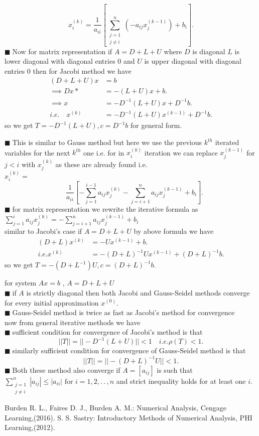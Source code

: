 \documentclass[11pt]{extarticle}
\newcommand{\ck}{.\,.\,}
\newcommand{\sm}[2]{\displaystyle\sum_{#1}^{#2}}
\newcommand{\tbx}[2][]{
\begin{tcolorbox}[enhanced,breakable,size=small,colback=black!2!white,title={#1},arc is angular, arc=1.5mm,drop fuzzy shadow]
	#2
\end{tcolorbox}
}
\newcommand{\y}{$\blacksquare\;$}
\begin{document}
\begin{multicols}{2}
{				\[ x_i^{(k)}=\frac{ 1 }{a_{ii}} \left[\sm{\substack{j=1 \\ j\neq i}}{n}(-a_{ij}x_j^{(k-1)}) +b_i\right].\]
				 \y Now for matrix representation if $ A=D+L+U $ where $ D $ is diagonal $ L $ is lower diagonal with diagonal entries $ 0 $ and $ U $ is upper diagonal with diagonal entries $ 0 $ then for Jacobi method we have 
				 \begin{align*}
				 	(D+L+U)x&=b\\
				 	\implies Dx*&= -(L+U)x+b.\\
				 	\implies x&=-D^{-1}(L+U)x+D^{-1}b.\\
				 	i.e. \quad x^{(k)}&=-D^{-1}(L+U)x^{(k-1)}+D^{-1}b.
				 	\end{align*}  
			 	so we get $ T=-D^{-1}(L+U),c=D^{-1}b $ for general form.}
				 \tbx[Gauss-Seidel Method]{ \y This is similar to Gauss method but here we use the previous $ k^{th} $ iterated variables for the next $ k^{th} $ one  i.e. for in $ x_i^{(k)} $ iteration we can replace $ x_j^{(k-1)} $ for $ j<i $ with $ x_j^{(k)} $ as these are already found i.e.\\
				 	 $x_i^{(k)}=$
				 \[\quad \frac{ 1 }{a_{ii}} \left[-\sm{j=1}{i-1}a_{ij}x_j^{(k)}-\sm{j=i+1}{n}a_{ij}x_j^{(k-1)}+b_i\right].\] 
				 \y for matrix representation we rewrite the iterative formula as \\
				 $\sm{j=1}{i}a_{ij}x_j^{(k)}=-\sm{j=i+1}{n}a_{ij}x_j^{(k-1)}+b_i$\\
				 similar to Jacobi's case if $ A=D+L+U $ by above formula we have 
				{ \small
					\begin{align*}
				 	(D+L)x^{(k)}&=-Ux^{(k-1)}+b.\\
				 	i.e. x^{(k)}&= -(D+L)^{-1}Ux^{(k-1)}+(D+L)^{-1}b.
				 	\end{align*}}
			 	so we get $ T=-(D+L^{-1})U,c=(D+L)^{-1}b. $ }
			 	\tbx{ for system $ Ax=b $ , $ A=D+L+U $ \\
			 		\y if $  A$ is strictly diagonal then both Jacobi and Gauss-Seidel methods converge for every initial approximation $ x^{(0)}. $ \\
			 		\y  Gauss-Seidel method is twice as fast as Jacobi's method for convergence \\
			 		now from general iterative methods we have \\
			 		\y sufficient condition for convergence of Jacobi's method is that 
			 		\[||T||=||-D^{-1}(L+U)||<1\quad i.e. \rho(T)<1.\]
			 		\y similarly  sufficient condition for convergence of Gauss-Seidel method is that 
			 		\[ ||T||=||-(D+L)^{-1}U||<1.\]
			 		\y Both these method also converge if $ A =[a_{ij}]$ is such that \\
			 		 $ \sm{\substack{j=1\\ j\neq i}}{n}|a_{ij}|\leq |a_{ii}| \text{ for } i=1,2,\ck,n $ and strict inequality holds for at least one $ i $.   }
			 		 
			 		 
\begin{thebibliography}{9}
	Burden R. L., Faires D. J., Burden A. M.: Numerical Analysis, Cengage Learning,(2016).
	S. S. Sastry: Introductory Methods of Numerical Analysis, PHI Learning,(2012).
\end{thebibliography}			 		 
			 		 
	\end{multicols}
\end{document}
